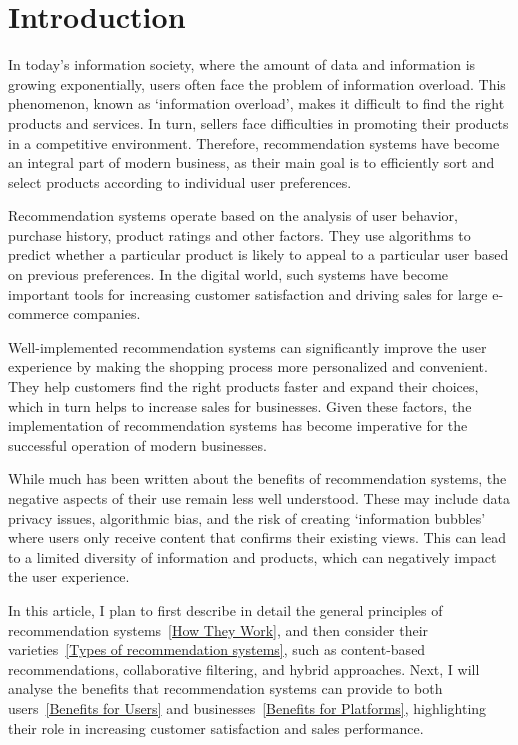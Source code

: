 \documentclass[10pt,twoside,slovak,a4paper]{article}
\begin{document}

\section{Introduction}
In today's information society, where the amount of data and information is growing exponentially, users often face the problem of information overload. This phenomenon, known as ‘information overload’, makes it difficult to find the right products and services. In turn, sellers face difficulties in promoting their products in a competitive environment. Therefore, recommendation systems have become an integral part of modern business, as their main goal is to efficiently sort and select products according to individual user preferences.

Recommendation systems operate based on the analysis of user behavior, purchase history, product ratings and other factors. They use algorithms to predict whether a particular product is likely to appeal to a particular user based on previous preferences. In the digital world, such systems have become important tools for increasing customer satisfaction and driving sales for large e-commerce companies.

Well-implemented recommendation systems can significantly improve the user experience by making the shopping process more personalized and convenient. They help customers find the right products faster and expand their choices, which in turn helps to increase sales for businesses. Given these factors, the implementation of recommendation systems has become imperative for the successful operation of modern businesses.


While much has been written about the benefits of recommendation systems, the negative aspects of their use remain less well understood. These may include data privacy issues, algorithmic bias, and the risk of creating ‘information bubbles’ where users only receive content that confirms their existing views. This can lead to a limited diversity of information and products, which can negatively impact the user experience.

In this article, I plan to first describe in detail the general principles of recommendation systems~\ref{How They Work}, and then consider their varieties~\ref{Types of recommendation systems}, such as content-based recommendations, collaborative filtering, and hybrid approaches. Next, I will analyse the benefits that recommendation systems can provide to both users~\ref{Benefits for Users} and businesses~\ref{Benefits for Platforms}, highlighting their role in increasing customer satisfaction and sales performance.
\end{document}
